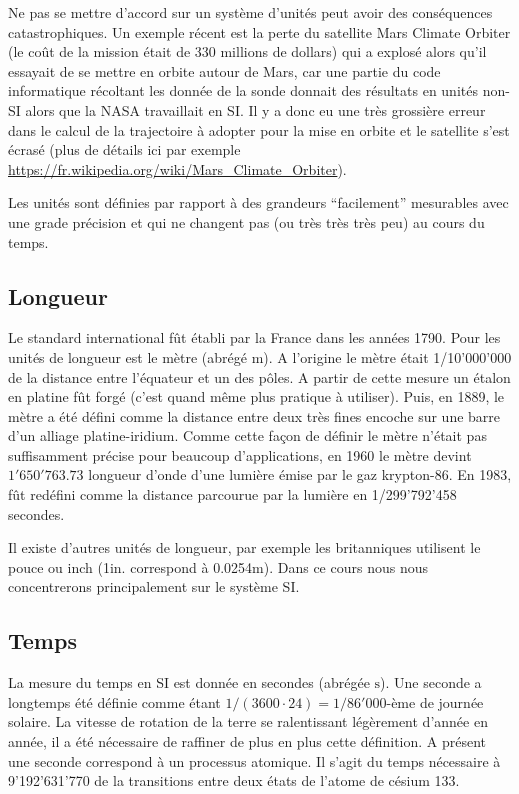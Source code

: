 \documentclass[a4paper,12pt]{book}
\newcommand{\m}{\mathrm{m}}
\newcommand{\s}{\mathrm{s}}
\begin{document}
Ne pas se mettre d'accord sur un système d'unités peut avoir des conséquences catastrophiques. Un exemple récent 
est la perte du satellite Mars Climate Orbiter (le coût de la mission était de 330 millions de dollars) 
qui a explosé alors qu'il essayait de se mettre en orbite autour de Mars,
car une partie du code informatique récoltant les donnée de la sonde donnait des résultats en unités 
non-SI alors que la NASA travaillait en SI. Il y a donc eu une très grossière erreur dans le calcul
de la trajectoire à adopter pour la mise en orbite et le satellite s'est écrasé (plus de détails ici par exemple \url{https://fr.wikipedia.org/wiki/Mars_Climate_Orbiter}).

Les unités sont définies par rapport à des grandeurs ``facilement'' mesurables avec une grade précision et qui ne changent pas (ou très très très peu)
au cours du temps.

\subsection{Longueur}

Le standard international fût établi par la France dans les années 1790. 
Pour les unités de longueur est le mètre (abrégé $\m$). A l'origine le mètre était 1/10'000'000 de la distance entre l'équateur et un des pôles.
A partir de cette mesure un étalon en platine fût forgé (c'est quand même plus pratique à utiliser). Puis, en 1889, le mètre a été défini comme la distance entre deux très fines encoche sur une barre d'un alliage platine-iridium. Comme cette façon de définir le mètre n'était pas suffisamment précise pour beaucoup d'applications, en 1960
le mètre devint $1'650'763.73$ longueur d'onde d'une lumière émise par le gaz krypton-86. En 1983, fût redéfini comme la distance parcourue par la lumière en 1/299'792'458 secondes.

Il existe d'autres unités de longueur, par exemple les britanniques utilisent le pouce  ou inch (1$\mathrm{in.}$ correspond à 0.0254$\m$). Dans ce cours nous nous concentrerons principalement
sur le système SI.

\subsection{Temps}

La mesure du temps en SI est donnée en secondes (abrégée $\s$). Une seconde a longtemps été définie comme étant $1/(3600\cdot 24)=1/86'000$-ème
de journée solaire. La vitesse de rotation de la terre se ralentissant légèrement d'année en année, il a été nécessaire de raffiner de plus en plus 
cette définition. A présent une seconde correspond à un processus atomique. Il s'agit du temps nécessaire à 9'192'631'770 de 
la transitions entre deux états de l'atome de césium 133. 
\end{document}
